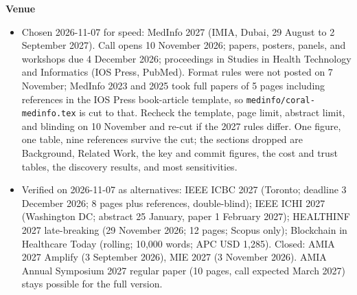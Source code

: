 \textbf{Venue}
\begin{itemize}
\item Chosen 2026-11-07 for speed: MedInfo 2027 (IMIA, Dubai, 29 August to 2 September 2027). Call opens 10 November 2026; papers, posters, panels, and workshops due 4 December 2026; proceedings in Studies in Health Technology and Informatics (IOS Press, PubMed). Format rules were not posted on 7 November; MedInfo 2023 and 2025 took full papers of 5 pages including references in the IOS Press book-article template, so \texttt{medinfo/coral-medinfo.tex} is cut to that. Recheck the template, page limit, abstract limit, and blinding on 10 November and re-cut if the 2027 rules differ. One figure, one table, nine references survive the cut; the sections dropped are Background, Related Work, the key and commit figures, the cost and trust tables, the discovery results, and most sensitivities.
\item Verified on 2026-11-07 as alternatives: IEEE ICBC 2027 (Toronto; deadline 3 December 2026; 8 pages plus references, double-blind); IEEE ICHI 2027 (Washington DC; abstract 25 January, paper 1 February 2027); HEALTHINF 2027 late-breaking (29 November 2026; 12 pages; Scopus only); Blockchain in Healthcare Today (rolling; 10,000 words; APC USD 1,285). Closed: AMIA 2027 Amplify (3 September 2026), MIE 2027 (3 November 2026). AMIA Annual Symposium 2027 regular paper (10 pages, call expected March 2027) stays possible for the full version.
\end{itemize}
